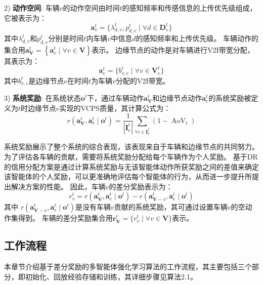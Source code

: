 2) \textbf{动作空间}: 车辆$v$的动作空间由时间$t$的感知频率和传感信息的上传优先级组成，它被表示为：
	\begin{equation}
		\boldsymbol{a}_{v}^{t}=\{ \lambda_{d, v}^{t}, p_{d, v}^{t} \mid \forall d \in \mathbf{D}_{v}^t\}
	\end{equation}
	\noindent 其中$\lambda_{d, v}^{t}$和$p_{d, v}^{t}$分别是时间$t$内车辆$v$中信息$d$的感知频率和上传优先级。
	车辆动作的集合用$\boldsymbol{a}_{\mathbf{V}}^{t} = \left\{\boldsymbol{a}_{v}^{t}\mid \forall v \in \mathbf{V}\right\}$表示。
	边缘节点的动作是对车辆进行V2I带宽分配，其表示为：
	\begin{equation}
		\boldsymbol{a}_{e}^{t}=\{b_{v, e}^{t} \mid \forall v \in \mathbf{V}_{e}^{t}\}
	\end{equation}
	其中$b_{v, e}^t$是边缘节点$e$在时间$t$为车辆$v$分配的V2I带宽。
	
3) \textbf{系统奖励}: 在系统状态$\boldsymbol{o}^{t}$下，通过车辆动作$\boldsymbol{a}_{\mathbf{V}}^{t}$和边缘节点动作$\boldsymbol{a}_{e}^{t}$的系统奖励被定义为$t$时边缘节点$e$实现的VCPS质量，其计算公式为：
	\begin{equation}
		r\left(\boldsymbol{a}_{\mathbf{V}}^{t},\boldsymbol{a}_{e}^{t} \mid \boldsymbol{o}^{t}\right)=\frac{1}{\left|\mathbf{I}_e^t\right|} \sum_{\forall i \in \mathbf{I}_e^t}\left(1 -\operatorname{AoV}_{i} \right)
	\end{equation}
	
系统奖励展示了整个系统的综合表现，该表现来自于车辆和边缘节点的共同努力。
为了评估各车辆的贡献，需要将系统奖励分配给每个车辆作为个人奖励。
基于DR的信用分配方案是通过计算系统奖励与无该智能体动作所获奖励之间的差值来确定该智能体的个人奖励，可以更准确地评估每个智能体的行为，从而进一步提升所提出解决方案的性能。
因此，车辆$v$的差分奖励表示为：
\begin{equation}
r_{v}^{t}=r\left(\boldsymbol{a}_{\mathbf{V}}^{t},\boldsymbol{a}_{e}^{t} \mid \boldsymbol{o}^{t}\right)-r\left(\boldsymbol{a}_{\mathbf{V}-v}^{t},\boldsymbol{a}_{e}^{t} \mid \boldsymbol{o}^{t}\right)
\end{equation}
\noindent 其中 $r\left(\boldsymbol{a}_{\mathbf{V}-v}^{t},\boldsymbol{a}_{e}^{t} \mid \boldsymbol{o}^{t}\right)$是没有车辆$v$贡献的系统奖励，其可通过设置车辆$v$的空动作集得到。
车辆的差分奖励集合用$\boldsymbol{r}_{\mathbf{V}}^{t}=\{ r_{v}^{t} \mid \forall v \in \mathbf{V}\}$表示。

\subsection[\hspace{-2pt}工作流程]{{ \hspace{-8pt}工作流程}}
本章节介绍基于差分奖励的多智能体强化学习算法的工作流程，其主要包括三个部分，即初始化、回放经验存储和训练，其详细步骤见算法2.1。

